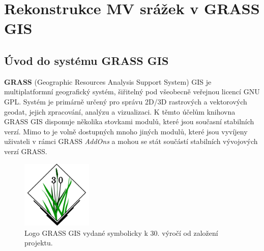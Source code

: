 \documentclass[a4paper,12pt]{article}
\begin{document}
\setcounter{footnote}{1}










\section{Rekonstrukce MV srážek v GRASS GIS}
\subsection{Úvod do systému GRASS GIS}
\textbf{GRASS} (Geographic Resources Analysis Support System) GIS  je multiplatformní geografický systém, šiřitelný pod všeobecně veřejnou licencí \acs{GNU GPL}. Systém je primárně určený pro správu 2D/3D rastrových a vektorových geodat, jejich zpracování, analýzu a vizualizaci. K těmto účelům knihovna GRASS GIS disponuje několika stovkami modulů, které jsou současní stabilních verzí. Mimo to je volně dostupných mnoho jiných modulů, které jsou vyvíjeny uživateli v rámci GRASS \textit{AddOns} a mohou se stát součástí stabilních vývojových verzí GRASS. 

\begin{figure}[h!]
    \centering
    \includegraphics[width=0.3\textwidth]{./img/grass/grasslogo.png}
    \caption[Logo GRASS]{\centering Logo GRASS GIS vydané symbolicky k 30. výročí od založení projektu. \footnotemark }
 \end{figure}   
\end{document}
